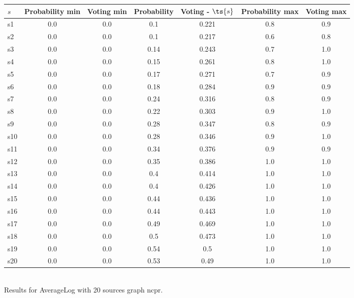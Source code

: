 \documentclass{article}
\begin{document}
\noindent\begin{tabular}{|l|c|c|c|c|c|c|}
\hline
$s$& Probability min & Voting min & Probability & Voting - $\ts{s}$ & Probability max & Voting max\\
\hline
s1 &0.0 & 0.0 & 0.1 & 0.221 & 0.8 & 0.9\\
\hline
s2 &0.0 & 0.0 & 0.1 & 0.217 & 0.6 & 0.8\\
\hline
s3 &0.0 & 0.0 & 0.14 & 0.243 & 0.7 & 1.0\\
\hline
s4 &0.0 & 0.0 & 0.15 & 0.261 & 0.8 & 1.0\\
\hline
s5 &0.0 & 0.0 & 0.17 & 0.271 & 0.7 & 0.9\\
\hline
s6 &0.0 & 0.0 & 0.18 & 0.284 & 0.9 & 0.9\\
\hline
s7 &0.0 & 0.0 & 0.24 & 0.316 & 0.8 & 0.9\\
\hline
s8 &0.0 & 0.0 & 0.22 & 0.303 & 0.9 & 1.0\\
\hline
s9 &0.0 & 0.0 & 0.28 & 0.347 & 0.8 & 0.9\\
\hline
s10 &0.0 & 0.0 & 0.28 & 0.346 & 0.9 & 1.0\\
\hline
s11 &0.0 & 0.0 & 0.34 & 0.376 & 0.9 & 0.9\\
\hline
s12 &0.0 & 0.0 & 0.35 & 0.386 & 1.0 & 1.0\\
\hline
s13 &0.0 & 0.0 & 0.4 & 0.414 & 1.0 & 1.0\\
\hline
s14 &0.0 & 0.0 & 0.4 & 0.426 & 1.0 & 1.0\\
\hline
s15 &0.0 & 0.0 & 0.44 & 0.436 & 1.0 & 1.0\\
\hline
s16 &0.0 & 0.0 & 0.44 & 0.443 & 1.0 & 1.0\\
\hline
s17 &0.0 & 0.0 & 0.49 & 0.469 & 1.0 & 1.0\\
\hline
s18 &0.0 & 0.0 & 0.5 & 0.473 & 1.0 & 1.0\\
\hline
s19 &0.0 & 0.0 & 0.54 & 0.5 & 1.0 & 1.0\\
\hline
s20 &0.0 & 0.0 & 0.53 & 0.49 & 1.0 & 1.0\\
\hline
\end{tabular}\\

\noindent Results for AverageLog with 20 sources graph ncpr.
\end{document}
